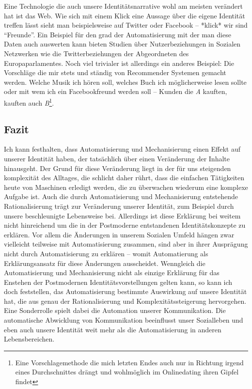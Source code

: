 Eine Technologie die auch unsere Identitätsnarrative wohl am meisten verändert hat ist das Web.
Wie sich mit einem Klick eine Aussage über die eigene Identität treffen lässt sieht man beispielsweise auf Twitter oder Facebook – *klick* wir sind \enquote{Freunde}.
Ein Beispiel für den grad der Automatisierung mit der man diese Daten auch auswerten kann bieten Studien über Nutzerbeziehungen in Sozialen Netzwerken wie die Twitterbeziehungen der Abgeordneten des Europaparlamentes\parencite{maireder}.
Noch viel trivialer ist allerdings ein anderes Beispiel: Die Vorschläge die mir stets und ständig von Recommender Systemen gemacht werden.
Welche Musik ich hören soll, welches Buch ich möglicherweise lesen sollte oder mit wem ich ein Facebookfreund werden soll – Kunden die \emph{A} kauften, kauften auch \emph{B}\footnote{Eine Vorschlagemethode die mich letzten Endes auch nur in Richtung irgend eines Durchschnittes drängt und wohlmöglich im Onlinedating ihren Gipfel findet}.


\subsection {Fazit}

Ich kann festhalten, dass Automatisierung und Mechanisierung einen Effekt auf unserer Identität haben, der tatsächlich über einen Veränderung der Inhalte hinausgeht.
Der Grund für diese Veränderung liegt in der für uns steigenden komplexität des Alltages, die schlicht daher rührt, dass die einfachen Tätigkeiten heute von Maschinen erledigt werden, die zu überwachen wiederum eine komplexe Aufgabe ist.
Auch die durch Automatisierung und Mechanisierung entstehende Rationalisierung trägt zur Veränderung unserer Identität, zum Beispiel durch unsere beschleunigte Lebensweise bei.
Allerdings ist diese Erklärung bei weitem nicht hinreichend um die in der Postmoderne entstandenen Identitätskonzepte zu erklären.
Vor allem die Änderungen in unserem Sozialen Umfeld hängen zwar vielleicht teilweise mit Automatisierung zusammen, sind aber in ihrer Ausprägung nicht durch Automatisierung zu erklären – womit Automatierung als Erklärungsansatz für diese Änderungen ausscheidet.
Wenngleich die Automatisierung und Mechanisierung nicht als einzige Erklärung für das Enstehen der Postmodernen Identitätsvorstellungen gelten kann, so kann ich doch feststellen, das Automatisierung bestimmte Auswirkung auf unsere Identität hat, die aus genau der Rationalisierung und Komplexitätssteigerung hervorgehen.
Eine Sonderrolle spielt dabei die Automation unserer Kommunikation.
Die automatische Abwicklung von Kommunikation beeinflusst unser Sozialleben und eben auch unsere Identität weit mehr als die Automatisierung in anderen Lebensbereichen.
